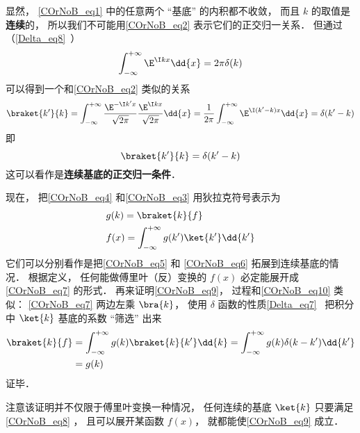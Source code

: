 显然， \autoref{COrNoB_eq1} 中的任意两个 “基底” 的内积都不收敛， 而且 $k$ 的取值是\textbf{连续}的， 所以我们不可能用\autoref{COrNoB_eq2} 表示它们的正交归一关系． 但通过（\autoref{Delta_eq8}~）
\begin{equation}
\int_{-\infty}^{+\infty} \E^{\I kx}\dd{x} = 2\pi \delta(k)
\end{equation}
可以得到一个和\autoref{COrNoB_eq2} 类似的关系
\begin{equation}
\braket{k'}{k} = \int_{-\infty}^{+\infty} \frac{\E^{-\I k'x}}{\sqrt{2\pi}} \frac{\E^{\I kx}}{\sqrt{2\pi}}\dd{x}
= \frac{1}{2\pi}\int_{-\infty}^{+\infty} \E^{\I (k'-k)x}\dd{x}
= \delta(k' - k)
\end{equation}
即
\begin{equation}\label{COrNoB_eq8}
\braket{k'}{k} = \delta(k' - k)
\end{equation}
这可以看作是\textbf{连续基底的正交归一条件}．

现在， 把\autoref{COrNoB_eq4}  和\autoref{COrNoB_eq3} 用狄拉克符号表示为
\begin{align}\label{COrNoB_eq9}
&g(k) = \braket{k}{f}\\
\label{COrNoB_eq7}&f(x) = \int_{-\infty}^{+\infty} g(k') \ket{k'} \dd{k'}
\end{align}
它们可以分别看作是把\autoref{COrNoB_eq5} 和 \autoref{COrNoB_eq6} 拓展到连续基底的情况． 根据定义， 任何能做傅里叶（反）变换的 $f(x)$ 必定能展开成\autoref{COrNoB_eq7} 的形式． 再来证明\autoref{COrNoB_eq9}， 过程和\autoref{COrNoB_eq10} 类似： \autoref{COrNoB_eq7} 两边左乘 $\bra{k}$， 使用 $\delta$ 函数的性质\autoref{Delta_eq7}~ 把积分中 $\ket{k}$ 基底的系数 “筛选” 出来
\begin{equation}
\begin{aligned}
\braket{k}{f} &= \int_{-\infty}^{+\infty} g(k) \braket{k}{k'} \dd{k} = \int_{-\infty}^{+\infty} g(k) \delta(k-k') \dd{k'}\\
&= g(k)
\end{aligned}
\end{equation}
证毕．

注意该证明并不仅限于傅里叶变换一种情况， 任何连续的基底 $\ket{k}$ 只要满足\autoref{COrNoB_eq8} ， 且可以展开某函数 $f(x)$， 就都能使\autoref{COrNoB_eq9} 成立．
